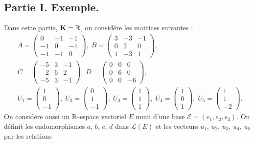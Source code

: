 \subsection*{Partie I. Exemple.}
Dans cette partie, $\mathbf{K}=\mathbb{R}$, on considère les matrices suivantes :
\begin{align*}
&A =
\begin{pmatrix}
0 & -1 & -1 \\ -1 & 0 & -1 \\ -1 & -1 & 0 
\end{pmatrix}
,\;
B =
\begin{pmatrix}
3 & -3 & -1 \\ 0 & 2 & 0 \\ 1 & -3 & 1 
\end{pmatrix}
,\; \\
&C =
\begin{pmatrix}
-5 & 3 & -1 \\ -2 & 6 & 2 \\ -5 & 3 & -1 
\end{pmatrix}
,\; 
D =
\begin{pmatrix}
0 & 0 & 0 \\ 0 & 6 & 0 \\ 0 & 0 & -6 
\end{pmatrix}
,\; \\
&U_1=
\begin{pmatrix}
1 \\ 0 \\ -1 
\end{pmatrix}
,\;
U_2=
\begin{pmatrix}
0 \\ 1 \\ -1 
\end{pmatrix}
,\;
U_3=
\begin{pmatrix}
1 \\ 1 \\ 1 
\end{pmatrix}
,\;
U_4=
\begin{pmatrix}
1 \\ 0 \\ 1 
\end{pmatrix}
,\;
U_5=
\begin{pmatrix}
1 \\ 1 \\ -2 
\end{pmatrix}.
\end{align*}
On considère aussi un $\mathbb{R}$-espace vectoriel $E$ muni d'une base $\mathcal{E}=(e_1,e_2,e_3)$. On définit les endomorphismes $a$, $b$, $c$, $d$ dans $\mathcal{L}(E)$ et les vecteurs $u_1$, $u_2$, $u_3$, $u_4$, $u_5$ par les relations
